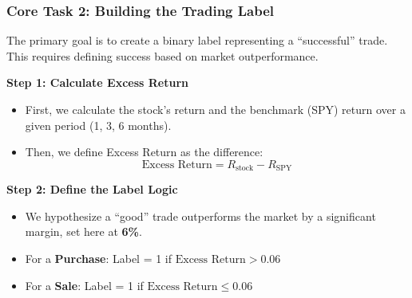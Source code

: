 \documentclass[aspectratio=169]{beamer}
\begin{document}
\begin{frame}
    \frametitle{Core Task 2: Building the Trading Label}
    The primary goal is to create a binary label representing a ``successful'' trade. This requires defining success based on market outperformance.

    \vspace{1em}
    \textbf{Step 1: Calculate Excess Return}
    \begin{itemize}
        \item First, we calculate the stock's return and the benchmark (SPY) return over a given period (1, 3, 6 months).
        \item Then, we define Excess Return as the difference:
        \[
        \text{Excess Return} = R_{\text{stock}} - R_{\text{SPY}}
        \]
    \end{itemize}
    \vspace{1em}
    \textbf{Step 2: Define the Label Logic}
    \begin{itemize}
        \item We hypothesize a ``good'' trade outperforms the market by a significant margin, set here at \textbf{6\%}.
        \item For a \textbf{Purchase}: Label = 1 if \(\text{Excess Return} > 0.06\)
        \item For a \textbf{Sale}: Label = 1 if \(\text{Excess Return} \leq 0.06\)
    \end{itemize}
\end{frame}
\end{document}

